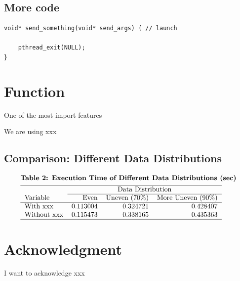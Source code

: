 \documentclass[11pt,A4]{article}
\begin{document}
\subsection{More code}



\lstset{language=C}
\lstset{breaklines=true}
\begin{lstlisting}
void* send_something(void* send_args) { // launch
    
    pthread_exit(NULL);
}
\end{lstlisting}




\section{Function}
One of the most import features

We are using xxx



\subsection{Comparison: Different Data Distributions}

$$
\begin{aligned}
&\textbf{Table 2: Execution Time of Different Data Distributions (sec)}\\
&\begin{tabular}{lrrr}
\hline & \multicolumn{3}{c}{Data Distribution} \\
\cline { 2 - 4 } Variable & Even & Uneven (70\%) & More Uneven (90\%) \\
\hline With xxx & 0.113004 & 0.324721 & 0.428407 \\
Without xxx & 0.115473 & 0.338165 & 0.435363\\
\hline
\end{tabular}
\end{aligned}
$$


\section{Acknowledgment}

I want to acknowledge xxx



\printbibliography[
heading=bibintoc,
] %
\end{document}
